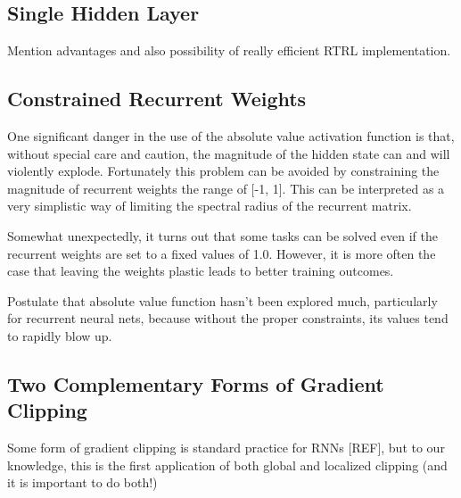 \documentclass{article}
\begin{document}


\subsection{Single Hidden Layer}

Mention advantages and also possibility of really efficient RTRL implementation.

\subsection{Constrained Recurrent Weights}

One significant danger in the use of the absolute value activation function is that, without special care and caution, the magnitude of the hidden state can and will violently explode. Fortunately this problem can be avoided by constraining the magnitude of recurrent weights the range of [-1, 1]. This can be interpreted as a very simplistic way of limiting the spectral radius of the recurrent matrix.

Somewhat unexpectedly, it turns out that some tasks can be solved even if the recurrent weights are set to a fixed values of 1.0. However, it is more often the case that leaving the weights plastic leads to better training outcomes.


Postulate that absolute value function hasn’t been explored much, particularly for recurrent neural nets, because without the proper constraints, its values tend to rapidly blow up.

\subsection{Two Complementary Forms of Gradient Clipping}

Some form of gradient clipping is standard practice for RNNs [REF], but to our knowledge, this is the first application of both global and localized clipping (and it is important to do both!)
\end{document}
